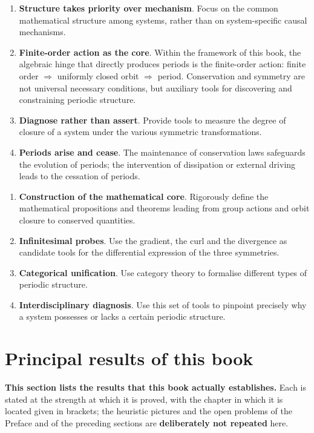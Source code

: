 \begin{enumerate}[leftmargin=5em, label={\textbf{Principle \arabic*}}]
    \item \textbf{Structure takes priority over mechanism}. Focus on the common mathematical structure among systems, rather than on system-specific causal mechanisms.
    \item \textbf{Finite-order action as the core}. Within the framework of this book, the algebraic hinge that directly produces periods is the finite-order action: finite order $\Rightarrow$ uniformly closed orbit $\Rightarrow$ period. Conservation and symmetry are not universal necessary conditions, but auxiliary tools for discovering and constraining periodic structure.
    \item \textbf{Diagnose rather than assert}. Provide tools to measure the degree of closure of a system under the various symmetric transformations.
    \item \textbf{Periods arise and cease}. The maintenance of conservation laws safeguards the evolution of periods; the intervention of dissipation or external driving leads to the cessation of periods.
\end{enumerate}

\begin{enumerate}[leftmargin=5em, label={\textbf{Step \arabic*}}]
    \item \textbf{Construction of the mathematical core}. Rigorously define the mathematical propositions and theorems leading from group actions and orbit closure to conserved quantities.
    \item \textbf{Infinitesimal probes}. Use the gradient, the curl and the divergence as candidate tools for the differential expression of the three symmetries.
    \item \textbf{Categorical unification}. Use category theory to formalise different types of periodic structure.
    \item \textbf{Interdisciplinary diagnosis}. Use this set of tools to pinpoint precisely why a system possesses or lacks a certain periodic structure.
\end{enumerate}

\section*{Principal results of this book}

\textbf{This section lists the results that this book actually establishes.} Each is stated at the strength at which it is proved, with the chapter in which it is located given in brackets; the heuristic pictures and the open problems of the Preface and of the preceding sections are \textbf{deliberately not repeated} here.

